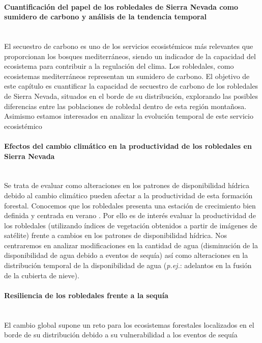 \paragraph{Cuantificación del papel de los robledales de Sierra Nevada como sumidero de carbono y análisis de la tendencia temporal} \mbox{} \\
El secuestro de carbono es uno de los servicios ecosistémicos más relevantes que proporcionan los bosques mediterráneos, siendo un indicador de la capacidad del ecosistema para contribuir a la regulación del clima. Los robledales, como ecosistemas mediterráneos representan un sumidero de carbono. El objetivo de este capítulo es cuantificar la capacidad  de secuestro de carbono de los robledales de Sierra Nevada, situados en el borde de su distribución, explorando las posibles diferencias entre las poblaciones de robledal dentro de esta región montañosa. Asimismo estamos interesados en analizar la evolución temporal de este servicio ecosistémico 

\paragraph{Efectos del cambio climático en la productividad de los robledales en Sierra Nevada}\mbox{} \\
Se trata de evaluar como alteraciones en los patrones de disponibilidad hídrica debido al cambio climático pueden afectar a la productividad de esta formación forestal. Conocemos que los robledales presenta una estación de crecimiento bien definida y centrada en verano . Por ello es de interés evaluar la productividad de los robledales (utilizando índices de vegetación obtenidos a partir de imágenes de satélite) frente a cambios en los patrones de disponibilidad hídrica. Nos centraremos en analizar modificaciones en la cantidad de agua (disminución de la disponibilidad de agua debido a eventos de sequía) así como alteraciones en la distribución temporal de la disponibilidad de agua (\emph{p.ej.}: adelantos en la fusión de la cubierta de nieve).

\paragraph{Resiliencia de los robledales frente a la sequía}\mbox{} \\
El cambio global supone un reto para los ecosistemas forestales localizados en el borde de su distribución debido a su vulnerabilidad a los eventos de sequía 

